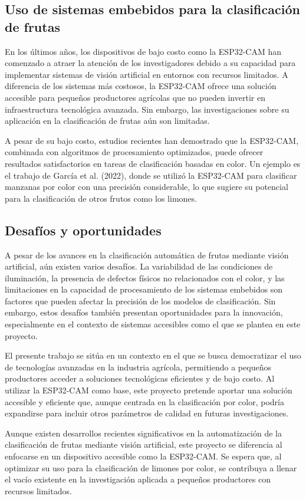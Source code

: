 \subsection{Uso de sistemas embebidos para la clasificación de frutas}

En los últimos años, los dispositivos de bajo costo como la ESP32-CAM han comenzado a atraer la atención de los investigadores debido a su capacidad para implementar sistemas de visión artificial en entornos con recursos limitados. A diferencia de los sistemas más costosos, la ESP32-CAM ofrece una solución accesible para pequeños productores agrícolas que no pueden invertir en infraestructura tecnológica avanzada. Sin embargo, las investigaciones sobre su aplicación en la clasificación de frutas aún son limitadas.

A pesar de su bajo costo, estudios recientes han demostrado que la ESP32-CAM, combinada con algoritmos de procesamiento optimizados, puede ofrecer resultados satisfactorios en tareas de clasificación basadas en color. Un ejemplo es el trabajo de García et al. (2022), donde se utilizó la ESP32-CAM para clasificar manzanas por color con una precisión considerable, lo que sugiere su potencial para la clasificación de otros frutos como los limones.

\subsection{Desafíos y oportunidades}

A pesar de los avances en la clasificación automática de frutas mediante visión artificial, aún existen varios desafíos. La variabilidad de las condiciones de iluminación, la presencia de defectos físicos no relacionados con el color, y las limitaciones en la capacidad de procesamiento de los sistemas embebidos son factores que pueden afectar la precisión de los modelos de clasificación. Sin embargo, estos desafíos también presentan oportunidades para la innovación, especialmente en el contexto de sistemas accesibles como el que se plantea en este proyecto.

El presente trabajo se sitúa en un contexto en el que se busca democratizar el uso de tecnologías avanzadas en la industria agrícola, permitiendo a pequeños productores acceder a soluciones tecnológicas eficientes y de bajo costo. Al utilizar la ESP32-CAM como base, este proyecto pretende aportar una solución accesible y eficiente que, aunque centrada en la clasificación por color, podría expandirse para incluir otros parámetros de calidad en futuras investigaciones.

Aunque existen desarrollos recientes significativos en la automatización de la clasificación de frutas mediante visión artificial, este proyecto se diferencia al enfocarse en un dispositivo accesible como la ESP32-CAM. Se espera que, al optimizar su uso para la clasificación de limones por color, se contribuya a llenar el vacío existente en la investigación aplicada a pequeños productores con recursos limitados.
